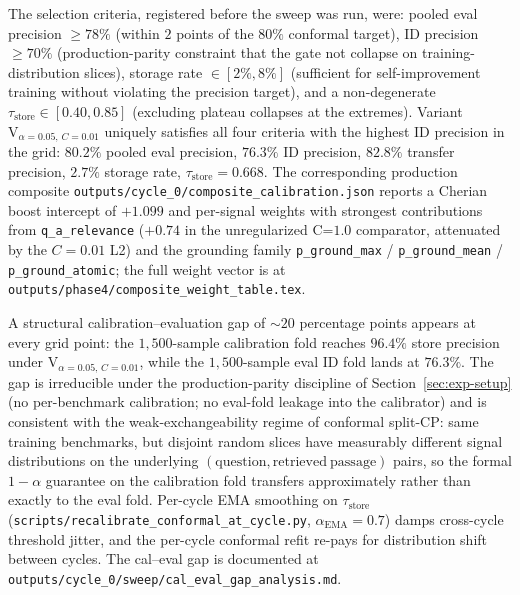

The selection criteria, registered before the sweep was run, were: pooled eval precision $\geq 78\%$ (within $2$ points of the $80\%$ conformal target), ID precision $\geq 70\%$ (production-parity constraint that the gate not collapse on training-distribution slices), storage rate $\in [2\%, 8\%]$ (sufficient for self-improvement training without violating the precision target), and a non-degenerate $\tau_{\text{store}} \in [0.40, 0.85]$ (excluding plateau collapses at the extremes). Variant $\mathrm{V}_{\alpha=0.05,\, C=0.01}$ uniquely satisfies all four criteria with the highest ID precision in the grid: $80.2\%$ pooled eval precision, $76.3\%$ ID precision, $82.8\%$ transfer precision, $2.7\%$ storage rate, $\tau_{\text{store}} = 0.668$. The corresponding production composite \texttt{outputs/cycle\_0/composite\_calibration.json} reports a Cherian boost intercept of $+1.099$ and per-signal weights with strongest contributions from \texttt{q\_a\_relevance} ($+0.74$ in the unregularized C=$1.0$ comparator, attenuated by the $C=0.01$ L2) and the grounding family \texttt{p\_ground\_max} / \texttt{p\_ground\_mean} / \texttt{p\_ground\_atomic}; the full weight vector is at \texttt{outputs/phase4/composite\_weight\_table.tex}.



A structural calibration--evaluation gap of $\sim 20$ percentage points appears at every grid point: the $1{,}500$-sample calibration fold reaches $96.4\%$ store precision under V$_{\alpha=0.05,\,C=0.01}$, while the $1{,}500$-sample eval ID fold lands at $76.3\%$. The gap is irreducible under the production-parity discipline of Section~\ref{sec:exp-setup} (no per-benchmark calibration; no eval-fold leakage into the calibrator) and is consistent with the weak-exchangeability regime of conformal split-CP: same training benchmarks, but disjoint random slices have measurably different signal distributions on the underlying $(\mathrm{question}, \mathrm{retrieved\ passage})$ pairs, so the formal $1-\alpha$ guarantee on the calibration fold transfers approximately rather than exactly to the eval fold. Per-cycle EMA smoothing on $\tau_{\text{store}}$ (\texttt{scripts/recalibrate\_conformal\_at\_cycle.py}, $\alpha_{\text{EMA}} = 0.7$) damps cross-cycle threshold jitter, and the per-cycle conformal refit re-pays for distribution shift between cycles. The cal--eval gap is documented at \texttt{outputs/cycle\_0/sweep/cal\_eval\_gap\_analysis.md}.

